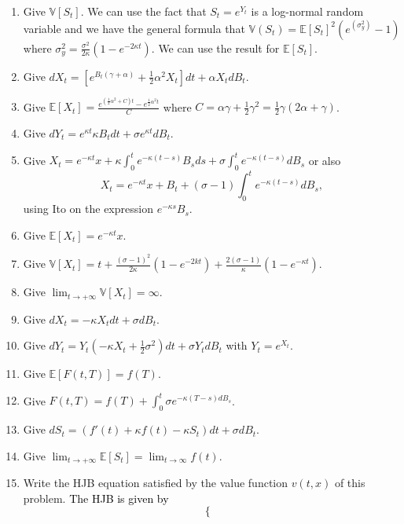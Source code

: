 \documentclass[11pt,a4paper]{article}
\theoremstyle{plain}
\theoremstyle{definition}
\begin{document}
\begin{enumerate}[label=Q\arabic*., start=1]
    \item Give $\mathbb{V}[S_t]$. We can use the fact that $S_t=e^{Y_t}$ is a log-normal random variable and we have the general formula that $\mathbb{V}(S_t)=\mathbb{E}[S_t]^2(e^{(\sigma_y^2)}-1)$ where $\sigma_y^2= \frac{\sigma^2}{2 \kappa}(1-e^{ -2 \kappa t})$. We can use the result for $\mathbb{E}[S_t]$.
    \item Give $dX_t = [e^{ B_t(\gamma + \alpha) } + \frac{1}{2} \alpha^2 X_t]dt + \alpha X_t dB_t$.
    \item Give $\mathbb{E}[X_t] = \frac{e^{(\frac{1}{2}\alpha^2 + C)t} - e^{\frac{1}{2}\alpha^2 t}}{C}$ where $C=\alpha \gamma + \frac{1}{2}\gamma^2 = \frac{1}{2}\gamma(2\alpha + \gamma)$.
    \item Give $dY_t = e^{\kappa t} \kappa B_t dt + \sigma e^{\kappa t} d B_t$.
    \item Give $X_t = e^{-\kappa t}x + \kappa \int_0^t e^{-\kappa(t-s)}B_s ds + \sigma \int_0^t e^{-\kappa(t-s)}dB_s$ or also
    \begin{equation*}
        X_t = e^{-\kappa t}x + B_t + (\sigma - 1 )\int_0^t e^{-\kappa(t-s)}dB_s,
    \end{equation*}
    using Ito on the expression $e^{-\kappa s}B_s$.
    \item Give $\mathbb{E}[X_t] = e^{-\kappa t}x$.
    \item Give $\mathbb{V}[X_t] = t + \frac{(\sigma -1)^2}{2 \kappa} (1-e^{-2kt}) + \frac{2(\sigma-1)}{\kappa}(1-e^{-\kappa t})$.
    \item Give $\lim_{t \to +\infty} \mathbb{V}[X_t] = \infty$.
    \item Give $dX_t = -\kappa X_t dt + \sigma dB_t$.
    \item Give $dY_t = Y_t (-\kappa X_t + \frac{1}{2}\sigma^2)dt + \sigma Y_t dB_t$ with $Y_t = e^{X_t}$.
    \item Give $\mathbb{E}[F(t, T)] = f(T)$.
    \item Give $F(t, T) = f(T) + \int_0^t \sigma e^{-\kappa(T-s)dB_s}$.
    \item Give $dS_t = (f'(t) + \kappa f(t) - \kappa S_t )dt + \sigma dB_t$.
    \item Give $\lim_{t \to +\infty} \mathbb{E}[S_t] = \lim_{t \rightarrow \infty} f(t) $.
    \item Write the HJB equation satisfied by the value function $v(t, x)$ of this problem.
        \textcolor{black}{The HJB is given by
        \begin{equation*}
        \begin{cases}

\end{cases}
\end{equation*}}
\end{enumerate}
\end{document}
